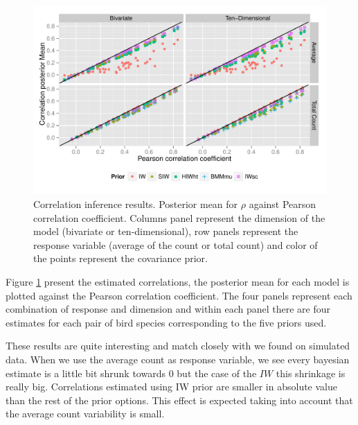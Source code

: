\documentclass[a4paper]{article}
\begin{document}
\begin{figure}[hbpt]
\centering
\includegraphics[width=\textwidth]{rescorr}
 \vspace{-.5in}
\caption{Correlation inference results. Posterior mean for $\rho$  against Pearson correlation coefficient. 
Columns panel represent the dimension of the model (bivariate or ten-dimensional), row panels represent the response variable (average of the count or total count)  and color of the points represent the covariance prior. \label{fig:coring}  }
\end{figure}
%

Figure \ref{fig:coring} present the estimated correlations, the posterior mean for each model is plotted against the Pearson correlation coefficient. The four panels represent each combination of response and dimension and within each panel there are four estimates for each pair of bird species corresponding to the five priors used. 

These results are quite interesting and match closely with we found on simulated data. When we use the average count as response variable, we see every bayesian estimate is a little bit shrunk towards 0 but the case of the $IW$ this shrinkage is really big. Correlations estimated using IW prior are smaller in absolute value than the rest of the prior options. This effect is expected taking into account that the average count variability is small. 
\end{document}
